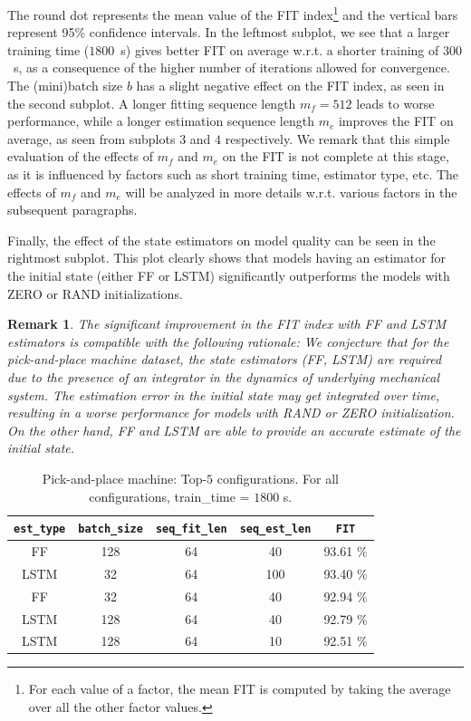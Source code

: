\documentclass{article}
\newcommand{\seqlen}{m}
\newtheorem{remark}{Remark}
\begin{document}
The round dot represents the mean value of the FIT index\footnote{For each value of a factor, the mean FIT is computed by taking the average over all the other factor values.} and the vertical bars represent 95\% confidence intervals.  In the leftmost subplot, we see that a larger training time ($1800$~s) gives better FIT on average w.r.t. a shorter training of $300$~s, as a consequence of the higher number of iterations allowed for convergence. The (mini)batch size $b$ has a slight negative effect on the FIT index, as seen in the second subplot. A longer fitting sequence length $\seqlen_f=512$ leads to worse performance, while a longer estimation sequence length $\seqlen_e$ improves the FIT on average, as seen from subplots $3$ and $4$ respectively. We remark that this simple evaluation of the effects of $\seqlen_f$ and $\seqlen_e$ on the FIT is not complete at this stage, as it is influenced by factors such as short training time, estimator type, etc. The effects of $\seqlen_f$ and $\seqlen_e$ will be analyzed in more details w.r.t. various factors in the subsequent paragraphs.  


Finally, the effect of the state estimators on model quality can be seen in the rightmost subplot. This plot clearly shows that models having an estimator for the initial state (either FF or LSTM) significantly outperforms the models with ZERO or RAND initializations.  %

\begin{remark}%
	The significant improvement in the FIT index with FF and LSTM estimators is compatible with the following rationale: 
	We conjecture that for the pick-and-place machine dataset, the state estimators (FF, LSTM)  are required due to the presence of an integrator in the dynamics of underlying mechanical system. The  estimation error in the initial state may get integrated over time, resulting in a worse performance for models with RAND or ZERO initialization. On the other hand, FF and LSTM are able to provide an accurate estimate of the initial state. 
\end{remark}


\begin{table}[t!]
    \centering
    \begin{tabular}{|c|c|c|c|c|}
    \hline
    \texttt{est\_type}  & \texttt{batch\_size} & \texttt{seq\_fit\_len} & \texttt{seq\_est\_len} & \texttt{FIT} \\
    \hline
FF  & 128 & 64 & 40 & 93.61 \% \\
LSTM  & 32 & 64 & 100 & 93.40 \% \\
FF & 32 &  64 &40 & 92.94 \% \\
LSTM  & 128 & 64& 40 & 92.79 \% \\
LSTM & 128 & 64& 10 &  92.51 \% \\
\hline
\end{tabular}
\vspace{0.2cm}
    \caption{Pick-and-place machine: Top-$5$ configurations. For all configurations, train\_time = $1800$ s.}
    \label{tab:top_config_p_and_p}
\end{table}
\end{document}
